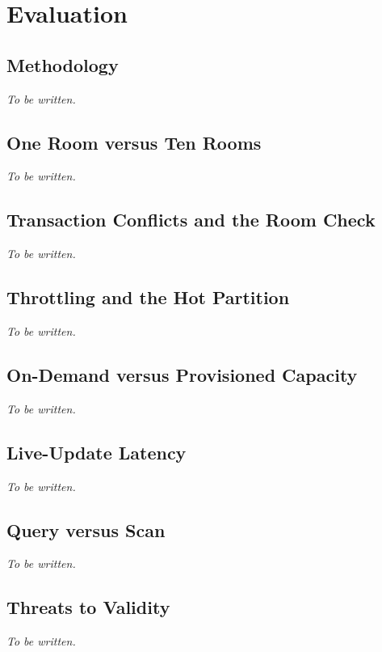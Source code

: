 
\section{Evaluation}\label{sec:evaluation}

\subsection{Methodology}

\textit{To be written.}

\subsection{One Room versus Ten Rooms}

\textit{To be written.}

\subsection{Transaction Conflicts and the Room Check}

\textit{To be written.}

\subsection{Throttling and the Hot Partition}

\textit{To be written.}

\subsection{On-Demand versus Provisioned Capacity}

\textit{To be written.}

\subsection{Live-Update Latency}

\textit{To be written.}

\subsection{Query versus Scan}

\textit{To be written.}

\subsection{Threats to Validity}

\textit{To be written.}
